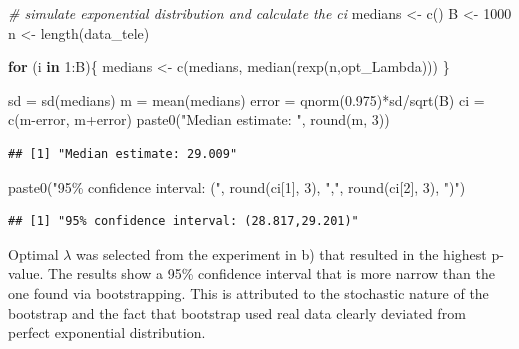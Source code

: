 \documentclass[
]{article}
\newenvironment{Shaded}{\begin{snugshade}}{\end{snugshade}}
\newcommand{\CommentTok}[1]{\textcolor[rgb]{0.56,0.35,0.01}{\textit{#1}}}
\newcommand{\ControlFlowTok}[1]{\textcolor[rgb]{0.13,0.29,0.53}{\textbf{#1}}}
\newcommand{\DecValTok}[1]{\textcolor[rgb]{0.00,0.00,0.81}{#1}}
\newcommand{\FloatTok}[1]{\textcolor[rgb]{0.00,0.00,0.81}{#1}}
\newcommand{\FunctionTok}[1]{\textcolor[rgb]{0.00,0.00,0.00}{#1}}
\newcommand{\NormalTok}[1]{#1}
\newcommand{\OtherTok}[1]{\textcolor[rgb]{0.56,0.35,0.01}{#1}}
\newcommand{\SpecialCharTok}[1]{\textcolor[rgb]{0.00,0.00,0.00}{#1}}
\newcommand{\StringTok}[1]{\textcolor[rgb]{0.31,0.60,0.02}{#1}}
\begin{document}
\begin{Shaded}
\begin{Highlighting}[]
\CommentTok{\# simulate exponential distribution and calculate the ci}
\NormalTok{medians }\OtherTok{\textless{}{-}} \FunctionTok{c}\NormalTok{()}
\NormalTok{B }\OtherTok{\textless{}{-}} \DecValTok{1000}
\NormalTok{n }\OtherTok{\textless{}{-}} \FunctionTok{length}\NormalTok{(data\_tele)}

\ControlFlowTok{for}\NormalTok{ (i }\ControlFlowTok{in} \DecValTok{1}\SpecialCharTok{:}\NormalTok{B)\{}
\NormalTok{  medians }\OtherTok{\textless{}{-}} \FunctionTok{c}\NormalTok{(medians, }\FunctionTok{median}\NormalTok{(}\FunctionTok{rexp}\NormalTok{(n,opt\_Lambda)))}
\NormalTok{\}}

\NormalTok{sd }\OtherTok{=} \FunctionTok{sd}\NormalTok{(medians)}
\NormalTok{m }\OtherTok{=} \FunctionTok{mean}\NormalTok{(medians)}
\NormalTok{error }\OtherTok{=} \FunctionTok{qnorm}\NormalTok{(}\FloatTok{0.975}\NormalTok{)}\SpecialCharTok{*}\NormalTok{sd}\SpecialCharTok{/}\FunctionTok{sqrt}\NormalTok{(B)}
\NormalTok{ci }\OtherTok{=} \FunctionTok{c}\NormalTok{(m}\SpecialCharTok{{-}}\NormalTok{error, m}\SpecialCharTok{+}\NormalTok{error)}
\FunctionTok{paste0}\NormalTok{(}\StringTok{"Median estimate: "}\NormalTok{, }\FunctionTok{round}\NormalTok{(m, }\DecValTok{3}\NormalTok{))}
\end{Highlighting}
\end{Shaded}

\begin{verbatim}
## [1] "Median estimate: 29.009"
\end{verbatim}

\begin{Shaded}
\begin{Highlighting}[]
\FunctionTok{paste0}\NormalTok{(}\StringTok{"95\% confidence interval: ("}\NormalTok{, }\FunctionTok{round}\NormalTok{(ci[}\DecValTok{1}\NormalTok{], }\DecValTok{3}\NormalTok{), }\StringTok{","}\NormalTok{, }\FunctionTok{round}\NormalTok{(ci[}\DecValTok{2}\NormalTok{], }\DecValTok{3}\NormalTok{), }\StringTok{")"}\NormalTok{)}
\end{Highlighting}
\end{Shaded}

\begin{verbatim}
## [1] "95% confidence interval: (28.817,29.201)"
\end{verbatim}

Optimal \(\lambda\) was selected from the experiment in b) that resulted
in the highest p-value. The results show a 95\% confidence interval that
is more narrow than the one found via bootstrapping. This is attributed
to the stochastic nature of the bootstrap and the fact that bootstrap
used real data clearly deviated from perfect exponential distribution.
\end{document}
